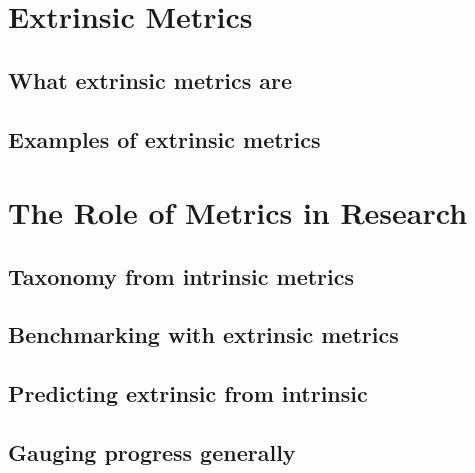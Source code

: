 \chapter{Extrinsic Metrics}
\section{What extrinsic metrics are}
\section{Examples of extrinsic metrics}

\chapter{The Role of Metrics in Research}
\section{Taxonomy from intrinsic metrics}
\section{Benchmarking with extrinsic metrics}
\section{Predicting extrinsic from intrinsic}
\section{Gauging progress generally}




